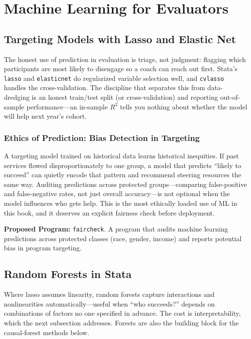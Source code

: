 \documentclass[
    a4paper,
    fontsize=10pt,
    twoside=true,
    numbers=noenddot,
]{kaobook}
\begin{document}
\chapter{Machine Learning for Evaluators}
\section{Targeting Models with Lasso and Elastic Net}
The honest use of prediction in evaluation is triage, not judgment: flagging which participants are most likely to disengage so a coach can reach out first. Stata's \texttt{lasso} and \texttt{elasticnet} do regularized variable selection well, and \texttt{cvlasso} handles the cross-validation. The discipline that separates this from data-dredging is an honest train/test split (or cross-validation) and reporting out-of-sample performance---an in-sample $R^2$ tells you nothing about whether the model will help next year's cohort.

\subsection{Ethics of Prediction: Bias Detection in Targeting}
A targeting model trained on historical data learns historical inequities. If past services flowed disproportionately to one group, a model that predicts \enquote{likely to succeed} can quietly encode that pattern and recommend steering resources the same way. Auditing predictions across protected groups---comparing false-positive and false-negative rates, not just overall accuracy---is not optional when the model influences who gets help. This is the most ethically loaded use of ML in this book, and it deserves an explicit fairness check before deployment.

\begin{kaobox}[frametitle=Ado-file Idea: \texttt{faircheck}]
\textbf{Proposed Program:} \texttt{faircheck}. A program that audits machine learning predictions across protected classes (race, gender, income) and reports potential bias in program targeting.
\end{kaobox}

\section{Random Forests in Stata}
Where lasso assumes linearity, random forests capture interactions and nonlinearities automatically---useful when \enquote{who succeeds?} depends on combinations of factors no one specified in advance. The cost is interpretability, which the next subsection addresses. Forests are also the building block for the causal-forest methods below.
\end{document}
